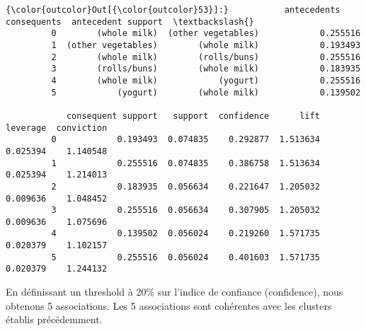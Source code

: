 \documentclass[11pt]{article}
\begin{document}
\begin{Verbatim}[commandchars=\\\{\}]
{\color{outcolor}Out[{\color{outcolor}53}]:}           antecedents         consequents  antecedent support  \textbackslash{}
         0        (whole milk)  (other vegetables)            0.255516   
         1  (other vegetables)        (whole milk)            0.193493   
         2        (whole milk)        (rolls/buns)            0.255516   
         3        (rolls/buns)        (whole milk)            0.183935   
         4        (whole milk)            (yogurt)            0.255516   
         5            (yogurt)        (whole milk)            0.139502   
         
            consequent support   support  confidence      lift  leverage  conviction  
         0            0.193493  0.074835    0.292877  1.513634  0.025394    1.140548  
         1            0.255516  0.074835    0.386758  1.513634  0.025394    1.214013  
         2            0.183935  0.056634    0.221647  1.205032  0.009636    1.048452  
         3            0.255516  0.056634    0.307905  1.205032  0.009636    1.075696  
         4            0.139502  0.056024    0.219260  1.571735  0.020379    1.102157  
         5            0.255516  0.056024    0.401603  1.571735  0.020379    1.244132  
\end{Verbatim}
            
    En définissant un threshold à 20\% sur l'indice de confiance
(confidence), nous obtenons 5 associations. Les 5 associations sont
cohérentes avec les clusters établis précédemment.


    
    
    
    
\end{document}
